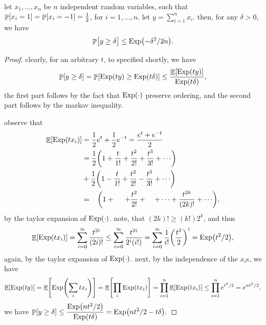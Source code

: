 \begin{fragment}{}
    \begin{theorem}
        let $x_1, \ldots, x_n$ be $n$ independent random variables,
        such that $\Prob{x_i =1} =\Prob{x_i=-1} = \frac{1}{2}$, for
        $i=1,\ldots, n$. let $y = \sum_{i=1}^n x_i$. then, for any
        $\delta >0$, we have
        \begin{align*}
            \Prob{\bigl. y \geq \delta} \leq \Exp \pth{-\delta^2/2n}.
        \end{align*}
    \end{theorem}%
\end{fragment}
% 
\begin{proof}
    clearly, for an arbitrary $t$, to specified shortly, we have
    \begin{align*}
        \Prob{y \geq \delta} = \Prob{\Exp \pth{ t y } \geq \Exp
           \pth{t\delta}} \leq \frac{\Ex{\Exp \pth{t y}}}{\Exp
           \pth{t\delta}},
    \end{align*}
    the first part follows by the fact that $\mathrm{Exp}(\cdot)$ preserve
    ordering, and the second part follows by the markov inequality.
    
    observe that
    \begin{align*}
        \Ex{ \Exp\pth{t x_i} }%
        &=%
        \frac{1}{2} e^{t} + \frac{1}{2}e^{-t} =
        \frac{e^t + e^{-t}}{2}\\
        &=%
        \frac{1}{2} \pth{1 + \frac{t}{1!} + \frac{t^2}{2!} +
           \frac{t^3}{3!} + \cdots}
        \\
        &+%
        \frac{1}{2}\pth{1 -\frac{t}{1!} + \frac{t^2}{2!} -
           \frac{t^3}{3!}
           + \cdots}\\
        &=%
        \;\; \;\pth{1 +\;\;\;\;\; + \frac{t^2}{2!} + \;\;\;\; +\cdots
           + \frac{t^{2k}}{(2k)!}  + \cdots},
    \end{align*}
    by the taylor expansion of $\mathrm{Exp}(\cdot)$. note, that $(2k)!\geq
    (k!) 2^k$, and thus
    \begin{align*}
        \Ex{ \Exp \pth{ t x_i } } = \sum_{i=0}^{\infty}
        \frac{t^{2i}}{(2i)!} \leq \sum_{i=0}^{\infty}
        \frac{t^{2i}}{2^i(i!)} = \sum_{i=0}^{\infty} \frac{1}{i!}\pth{
           \frac{t^2}{2}}^i = \Exp \pth{t^2/2},
    \end{align*}
    again, by the taylor expansion of $\mathrm{Exp}(\cdot)$. next, by the
    independence of the $x_i$s, we have
    \begin{align*}
        \Ex{\Exp \pth{t y}}%
        =%
        \Ex{\Exp \pth{\sum_i t x_i}}%
        =%
        \Ex{\prod_i \Exp\pth{t x_i}}%
        =%
        \prod_{i=1}^{n} \Ex{\Exp\pth{t x_i}} \leq%
        \prod_{i=1}^{n} e^{t^2/2}%
        =%
        e^{n t^2/2}.
    \end{align*}
    we have
    \begin{math}
        \ds \Prob{y \geq \delta} \leq \frac{\Exp\pth{n t^2/2}}{\Exp
           \pth{t\delta}} = \Exp \pth{n t^2/2 - t\delta}.
    \end{math}
    

\end{proof}

